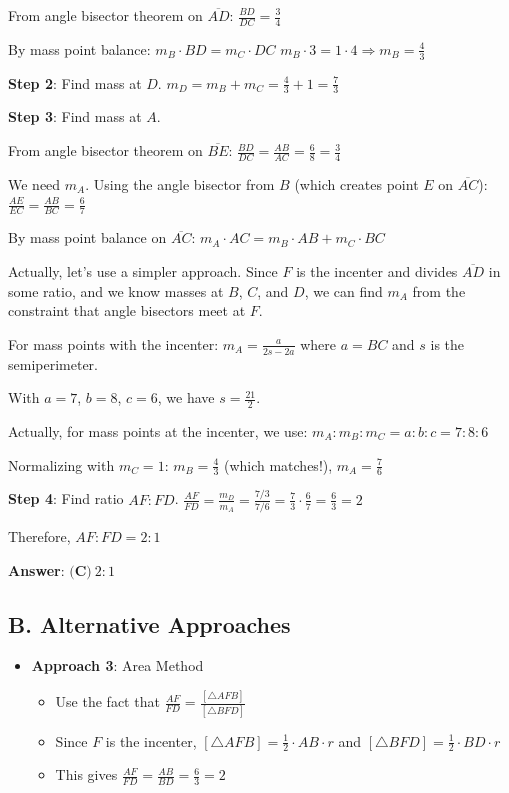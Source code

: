 \documentclass[12pt]{article}
\begin{document}
\begin{roadmapbox}
From angle bisector theorem on $\overline{AD}$: $\frac{BD}{DC} = \frac{3}{4}$

By mass point balance: $m_B \cdot BD = m_C \cdot DC$
$m_B \cdot 3 = 1 \cdot 4 \Rightarrow m_B = \frac{4}{3}$

\textbf{Step 2}: Find mass at $D$.
$m_D = m_B + m_C = \frac{4}{3} + 1 = \frac{7}{3}$

\textbf{Step 3}: Find mass at $A$.

From angle bisector theorem on $\overline{BE}$: $\frac{BD}{DC} = \frac{AB}{AC} = \frac{6}{8} = \frac{3}{4}$

We need $m_A$. Using the angle bisector from $B$ (which creates point $E$ on $\overline{AC}$):
$\frac{AE}{EC} = \frac{AB}{BC} = \frac{6}{7}$

By mass point balance on $\overline{AC}$: $m_A \cdot AC = m_B \cdot AB + m_C \cdot BC$

Actually, let's use a simpler approach. Since $F$ is the incenter and divides $\overline{AD}$ in some ratio, and we know masses at $B$, $C$, and $D$, we can find $m_A$ from the constraint that angle bisectors meet at $F$.

For mass points with the incenter: $m_A = \frac{a}{2s-2a}$ where $a = BC$ and $s$ is the semiperimeter.

With $a = 7$, $b = 8$, $c = 6$, we have $s = \frac{21}{2}$.

Actually, for mass points at the incenter, we use: $m_A : m_B : m_C = a : b : c = 7 : 8 : 6$

Normalizing with $m_C = 1$: $m_B = \frac{4}{3}$ (which matches!), $m_A = \frac{7}{6}$

\textbf{Step 4}: Find ratio $AF:FD$.
$\frac{AF}{FD} = \frac{m_D}{m_A} = \frac{7/3}{7/6} = \frac{7}{3} \cdot \frac{6}{7} = \frac{6}{3} = 2$

Therefore, $AF : FD = 2 : 1$

\textbf{Answer}: $\boxed{\textbf{(C)}\ 2:1}$

\subsection*{B. Alternative Approaches}
\begin{itemize}[leftmargin=*]
    \item \textbf{Approach 3}: Area Method
    \begin{itemize}
        \item Use the fact that $\frac{AF}{FD} = \frac{[\triangle AFB]}{[\triangle BFD]}$
        \item Since $F$ is the incenter, $[\triangle AFB] = \frac{1}{2} \cdot AB \cdot r$ and $[\triangle BFD] = \frac{1}{2} \cdot BD \cdot r$
        \item This gives $\frac{AF}{FD} = \frac{AB}{BD} = \frac{6}{3} = 2$
    \end{itemize}
    

\end{itemize}
\end{roadmapbox}
\end{document}
